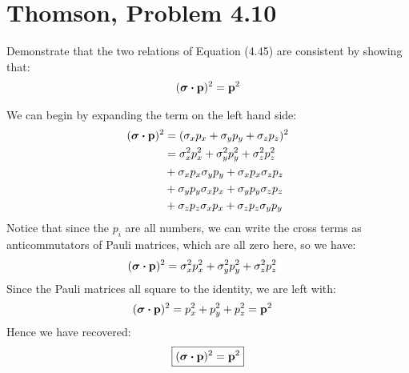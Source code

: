 \documentclass[12pt]{article}
\begin{document}
\section{Thomson, Problem 4.10}
\begin{problem}
  Demonstrate that the two relations of Equation (4.45) are consistent by showing that:
  \begin{align*}
    (\bm{\sigma}\vdot\vb{p})^2=\vb{p}^2
  \end{align*}
\end{problem}
We can begin by expanding the term on the left hand side:
\begin{align*}
  (\bm{\sigma}\vdot\vb{p})^2&=
  (\sigma_xp_x+\sigma_yp_y+\sigma_zp_z)^2\\
  &=\sigma_x^2p_x^2+\sigma_y^2p_y^2+\sigma_z^2p_z^2\\
  &+\sigma_xp_x\sigma_yp_y+\sigma_xp_x\sigma_zp_z\\
  &+\sigma_yp_y\sigma_xp_x+\sigma_yp_y\sigma_zp_z\\
  &+\sigma_zp_z\sigma_xp_x+\sigma_zp_z\sigma_yp_y
\end{align*}
Notice that since the $p_i$ are all numbers, we can write the cross terms as anticommutators of Pauli matrices, which are all zero here, so we have:
\begin{align*}
  (\bm{\sigma}\vdot\vb{p})^2&=\sigma_x^2p_x^2+\sigma_y^2p_y^2+\sigma_z^2p_z^2
\end{align*}
Since the Pauli matrices all square to the identity, we are left with:
\begin{align*}
  (\bm{\sigma}\vdot\vb{p})^2&=p_x^2+p_y^2+p_z^2=\vb{p}^2
\end{align*}
Hence we have recovered:
\begin{equation}
  \label{eq:p4}
  \boxed{(\bm{\sigma}\vdot\vb{p})^2=\vb{p}^2}
\end{equation}
\newpage
\end{document}
